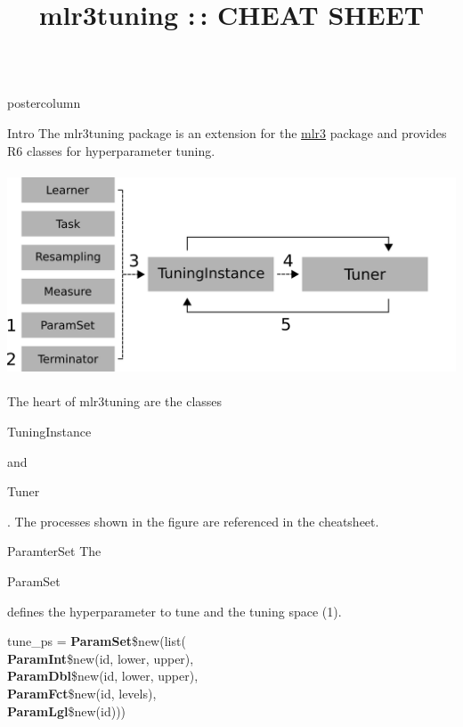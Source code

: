 \documentclass{beamer}
\title{mlr3tuning :\,: CHEAT SHEET} %
\newlength{\columnheight} %
\newcommand{\codeinline}[1]{\begin{codeboxinline}#1\end{codeboxinline}}
\begin{document}
\begin{frame}[fragile]{}
	\begin{columns}
		\begin{column}{.245\textwidth}
			\begin{beamercolorbox}[center]{postercolumn}
				\begin{minipage}{.98\textwidth}
					\parbox[t][\columnheight]{\textwidth}{
						\begin{myblock}{Intro}
							The mlr3tuning package is an extension for the \href{https://github.com/mlr-org/mlr3}{mlr3} package and provides R6 classes for hyperparameter tuning.
							\\
							\\
							\includegraphics[width=\textwidth]{img/tuning_objects.png}
							\\
							\\
							The heart of mlr3tuning are the classes \codeinline{TuningInstance} and \codeinline{Tuner}. The processes shown in the figure are referenced in the cheatsheet. 
						\end{myblock}
						\begin{myblock}{ParamterSet}
							The \codeinline{ParamSet} defines the hyperparameter to tune and the tuning space (1).
							\\
							\begin{codeboxmultiline}[width=19cm]
								tune\_ps = \textbf{ParamSet}\$new(list(\\
								\hspace*{1ex}\textbf{ParamInt}\$new(id, lower, upper),\\
								\hspace*{1ex}\textbf{ParamDbl}\$new(id, lower, upper),\\
								\hspace*{1ex}\textbf{ParamFct}\$new(id, levels),\\
								\hspace*{1ex}\textbf{ParamLgl}\$new(id)))

\end{codeboxmultiline}
\end{myblock}}
\end{minipage}
\end{beamercolorbox}
\end{column}
\end{columns}
\end{frame}
\end{document}
